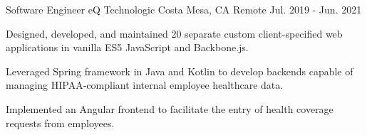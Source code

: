 \begin{cventries}
  \cventry
    {Software Engineer} %
    {eQ Technologic} %
    {Costa Mesa, CA \cdotp Remote} %
    {Jul. 2019 - Jun. 2021} %
    {
      \begin{cvitems} %
        \item {Designed, developed, and maintained 20 separate custom client-specified web applications in vanilla ES5 JavaScript and Backbone.js.}
        \item {Leveraged Spring framework in Java and Kotlin to develop backends capable of managing HIPAA-compliant internal employee healthcare data.}
        \item {Implemented an Angular frontend to facilitate the entry of health coverage requests from employees.}
      \end{cvitems}
    }

\end{cventries}
